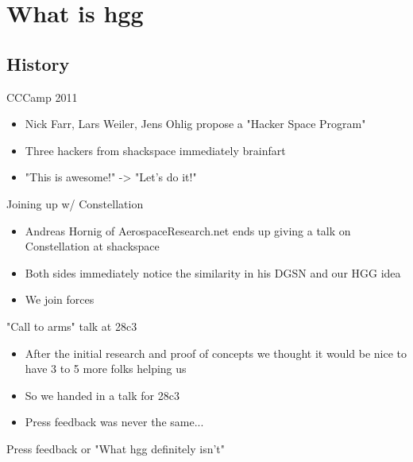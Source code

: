 
\newlength{\smallcol}
\setlength{\smallcol}{0.333333333333\textwidth}

\newlength{\bigcol}
\setlength{\bigcol}{\textwidth}
\addtolength{\bigcol}{- \smallcol}


\begin{frame}[plain]
\end{frame}

\section{What is hgg}

\subsection{History}
	\begin{frame}{CCCamp 2011}
		\begin{itemize}
			\item Nick Farr, Lars Weiler, Jens Ohlig propose a "Hacker Space Program"
			\item Three hackers from shackspace immediately brainfart
			\item "This is awesome!" -> "Let's do it!"
		\end{itemize}
	\end{frame}
	\begin{frame}{Joining up w/ Constellation}
		\begin{itemize}
			\item Andreas Hornig of AerospaceResearch.net ends up giving a talk on Constellation at shackspace
			\item Both sides immediately notice the similarity in his DGSN and our HGG idea
			\item We join forces
		\end{itemize}
	\end{frame}
	\begin{frame}{"Call to arms" talk at 28c3}
		\begin{itemize}
			\item After the initial research and proof of concepts we thought it would be nice to have 3 to 5 more folks helping us
			\item So we handed in a talk for 28c3
			\item Press feedback was never the same...
		\end{itemize}
	\end{frame}
	\begin{frame}{Press feedback or "What hgg definitely isn't"}
	\end{frame}

